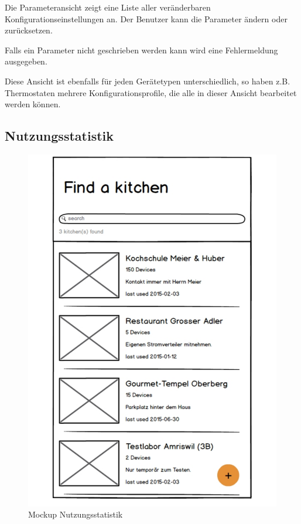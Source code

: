 Die Parameteransicht zeigt eine Liste aller veränderbaren Konfigurationseinstellungen an. Der Benutzer kann die Parameter ändern oder zurücksetzen.

Falls ein Parameter nicht geschrieben werden kann wird eine Fehlermeldung ausgegeben.

Diese Ansicht ist ebenfalls für jeden Gerätetypen unterschiedlich, so haben z.B. Thermostaten mehrere Konfigurationsprofile, die alle in dieser Ansicht bearbeitet werden können.

\WFclear
\vspace{2cm}

\subsection{Nutzungsstatistik}
\label{subsec:Nutzungsstatistik}

\begin{figure}
	\begin{center}
		\includegraphics[page=7,trim=0 0 0 0,clip,scale=0.21]{uiux/res/mockups}
		\caption{Mockup Nutzungsstatistik}
		\label{abb:mockDeviceUsage}
	\end{center}
\end{figure}

